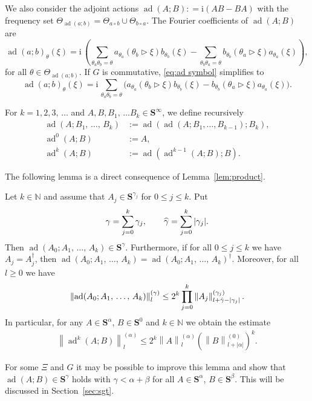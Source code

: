 \documentclass[AHL,Unicode,longabstracts,published]{cedram}
\DeclareMathOperator{\ad}{ad}
\newcommand{\rmi}{\mathrm{i}}
\newcommand{\N}{\mathbb N}
\newcommand{\BS}{\mathbf S}
\newcommand{\act}{\triangleright}
\newcommand{\abs}[1]{\left\lvert #1 \right\rvert}
\newcommand{\snorm}[3]{\left\| #1\right\|_{#3}^{(#2)}}
\let\oldhat\hat
\renewcommand*{\hat}[1]{\mathchoice{\widehat{#1}}{\widehat{#1}}{\oldhat{#1}}{\oldhat{#1}}}
\begin{document}
We also consider the adjoint actions $\ad(A;B): = \rmi(AB -BA)$ with the frequency set $\Theta_{\ad(a;b)} = \Theta_{a \circ b } \cup \Theta_{b \circ a}$. The Fourier coefficients of $\ad(A;B)$ are
\begin{equation}\label{eq:ad symbol}
\ad(a;b)_\theta(\xi) = \rmi\, \left(\sum_{\theta_a \theta_b = \theta} a_{\theta_a}(\theta_b\act\xi) b_{\theta_b}(\xi) -
\sum_{\theta_b \theta_a = \theta} b_{\theta_b}(\theta_a\act\xi)a_{\theta_a}(\xi)\right),
\end{equation}
for all $\theta \in \Theta_{\ad(a;b)}$. If $G$ is commutative, \eqref{eq:ad symbol} simplifies to
\begin{equation}\label{eq:adcom}
\ad(a;b)_\theta(\xi) = \rmi\, \sum_{\theta_a \theta_b = \theta}\big(a_{\theta_a}(\theta_b\act\xi) b_{\theta_b}(\xi) - b_{\theta_b}(\theta_a\act\xi)a_{\theta_a}(\xi)\big).
\end{equation}

For $k=1,2,3,\,\dots$ and $A,B,B_1,\,\dots B_k\in\BS^\infty$, we define recursively \label{page:defad}
\begin{equation}\label{eq:defadk}
\begin{aligned}
\ad(A;B_1,\,\dotsc,\,B_k) &:= \ad\left(\ad(A;B_1,\dotsc,B_{k-1});B_k\right),\\
\ad^0(A;B)&:= A,\\
\ad^k(A;B)&:= \ad\left(\ad^{k -1}(A;B);B\right).
\end{aligned}
\end{equation}

The following lemma is a direct consequence of Lemma~\ref{lem:product}.
\begin{lemm}\label{lem:weakcommest}
Let $k \in \N$ and assume that $A_j \in \BS^{\gamma_j}$ for $0 \le j \le k$. Put
\begin{equation}
\gamma = \sum_{j=0}^k \gamma_j, \qquad \hat\gamma =\sum_{j=0}^k |\gamma_j|.
\end{equation}
Then $\ad(A_0;A_1,\,\dotsc,\,A_k) \in \BS^{\gamma}$. Furthermore, if for all $0 \le j\le k$ we have $A_j = A_j^\dagger$, then $\ad(A_0;A_1,\,\dotsc,\,A_k)=\ad(A_0;A_1,\,\dotsc,\,A_k)^\dagger$. Moreover, for all $l
\ge 0$ we have
\begin{equation}
\begin{aligned}\label{eq:normestcomm}
\snorm{\ad(A_0;A_1,\,\dotsc,\,A_k)}{\gamma}{l}\leq 2^{k}
\prod_{j=0}^k \snorm{A_j}{\gamma_{j}}{l + \hat\gamma - |\gamma_j|}.
\end{aligned}
\end{equation}
In particular, for any $A\in\BS^{\alpha}$, $B\in\BS^{0}$ and $k\in\N$ we obtain the estimate
\begin{align}\label{eq:normestcommzeroorder}
\snorm{\ad^k(A;B)}{\alpha}{l}\leq 2^k \snorm{A}{\alpha}{l}
\left(\snorm{B}{0}{l + \abs{\alpha}}\right)^k.
\end{align}
\end{lemm}
For some $\Xi$ and $G$ it may be possible to improve this lemma and show that $\ad(A;B)\in\BS^\gamma$ holds with $\gamma<\alpha+\beta$ for all $A\in\BS^{\alpha}$, $B\in\BS^{\beta}$. This will be discussed in Section~\ref{sec:sgt}.
\end{document}
